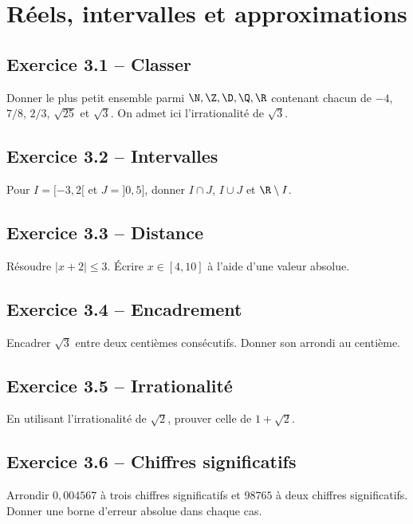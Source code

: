 \chapter{Réels, intervalles et approximations}
\section*{Exercice 3.1 -- Classer}
Donner le plus petit ensemble parmi $\N,\Z,\D,\Q,\R$ contenant chacun de $-4$, $7/8$, $2/3$, $\sqrt{25}$ et $\sqrt3$. On admet ici l'irrationalité de $\sqrt3$.

\section*{Exercice 3.2 -- Intervalles}
Pour $I=[-3,2[$ et $J=]0,5]$, donner $I\cap J$, $I\cup J$ et $\R\setminus I$.

\section*{Exercice 3.3 -- Distance}
Résoudre $|x+2|\leq3$. Écrire $x\in[4,10]$ à l'aide d'une valeur absolue.

\section*{Exercice 3.4 -- Encadrement}
Encadrer $\sqrt3$ entre deux centièmes consécutifs. Donner son arrondi au centième.

\section*{Exercice 3.5 -- Irrationalité}
En utilisant l'irrationalité de $\sqrt2$, prouver celle de $1+\sqrt2$.

\section*{Exercice 3.6 -- Chiffres significatifs}
Arrondir $0{,}004567$ à trois chiffres significatifs et $98765$ à deux chiffres significatifs. Donner une borne d'erreur absolue dans chaque cas.
